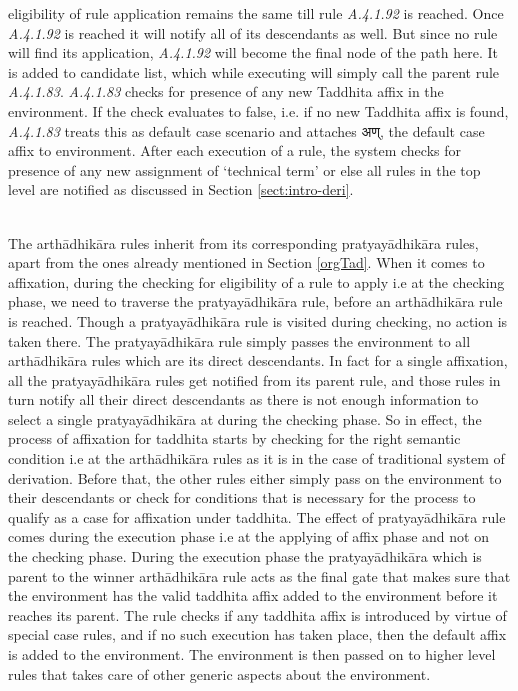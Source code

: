 \documentclass[11pt]{article}
\begin{document}
eligibility of rule application remains the same till rule {\sl A.4.1.92} is reached. Once {\sl A.4.1.92} is reached it will notify all of its descendants as well. But since no rule will find its application, {\sl A.4.1.92} will become the final node of the path here. It is added to candidate list, which while executing will simply call the parent rule {\sl A.4.1.83}. {\sl A.4.1.83} checks for presence of any new Taddhita affix in the environment. If the check evaluates to false, i.e. if no new Taddhita affix is found, {\sl A.4.1.83} treats this as default case scenario and attaches {\skt अण्}, the default case affix to environment. After each execution of a rule, the system checks for presence of any new assignment of `technical term' or else all rules in the top level are notified as discussed in Section \ref{sect:intro-deri}.


\\
The arthādhikāra rules inherit from its corresponding pratyayādhikāra rules, apart from the ones already mentioned in Section \ref{orgTad}. When it comes to affixation, during the checking for eligibility of a rule to apply i.e at the checking phase, we need to traverse the  pratyayādhikāra rule, before an arthādhikāra rule is reached. Though a pratyayādhikāra rule is visited during checking, no action is taken there. The pratyayādhikāra rule simply passes the environment to all arthādhikāra rules which are its direct descendants. In fact for a single affixation, all the pratyayādhikāra rules get notified from its parent rule, and those rules in turn notify all their direct descendants as there is not enough information to select a single pratyayādhikāra at during the checking phase. So in effect, the process of affixation for taddhita starts by checking for the right semantic condition i.e at the arthādhikāra rules as it is in the case of traditional system of derivation. Before that, the other rules either simply pass on the environment to their descendants or check for conditions that is necessary for the process to qualify as a case for affixation under taddhita. The effect of pratyayādhikāra rule comes during the execution phase i.e at the applying of affix phase and not on the checking phase. During the execution phase the pratyayādhikāra which is parent to the winner arthādhikāra rule acts as the final gate that makes sure that the environment has the valid taddhita affix added to the environment before it reaches its parent. The rule checks if any taddhita affix is introduced by virtue of special case rules, and if no such execution has taken place, then the default affix is added to the environment. The environment is then passed on to higher level rules that takes care of other generic aspects about the environment.
\end{document}

